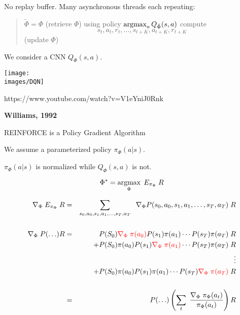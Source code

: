 {
No replay buffer.
Many asynchronous threads each repeating:
\vfill

  \begin{quotation}
  \noindent $\tilde{\Phi} = \Phi$ (retrieve $\Phi$)\newline \newline
  \noindent using policy $\operatorname*{argmax}_a Q_{\tilde{\Phi}}(s,a)$ compute $$s_t,a_t,r_t,\ldots,s_{t+K},a_{t+K},r_{t+K}$$
  \newline
   (update $\Phi$)
  \end{quotation}

\vfill
We consider a CNN $Q_\Phi(s,a)$.

\vfill
\centerline{\texttt{[image: \\images/DQN]}}


https://www.youtube.com/watch?v=V1eYniJ0Rnk


\centerline{\bf Williams, 1992}

\vfill
REINFORCE is a Policy Gradient Algorithm

\vfill
We assume a parameterized policy $\pi_\Phi(a|s)$.

\vfill
$\pi_\Phi(a|s)$ is normalized while $Q_\Phi(s,a)$ is not.


$$\Phi^* = \operatorname*{argmax}_\Phi\; E_{\pi_\Phi} \; R$$

{\huge
\begin{eqnarray*}
  \nabla_\Phi \;E_{\pi_\Phi}\;R & = & \sum_{s_0,a_0,s_1,a_1,\ldots,s_T,a_T}\;\;\nabla_\Phi P(s_0,a_0,s_1,a_1,\ldots,s_T,a_T)\;R \\
  \\
  \nabla_\Phi \;P(\ldots)R & = & P(S_0){\color{red} \nabla_\Phi \;\pi(a_0)}P(s_1)\pi(a_1) \cdots P(s_T)\pi(a_T)\;R \\
  & & + P(S_0)\pi(a_0)P(s_1){\color{red} \nabla_\Phi\;\pi(a_1)} \cdots P(s_T)\pi(a_T)\;R \\
  & & \vdots \\
  & & + P(S_0)\pi(a_0)P(s_1)\pi(a_1) \cdots P(s_T){\color{red} \nabla_\Phi\;\pi(a_T)}\;R \\
  \\
  & = & P(\ldots) \left(\sum_t\;\frac{\nabla_\Phi\;\pi_\Phi(a_t)}{\pi_\Phi(a_t)}\right) R
\end{eqnarray*}
}


}
